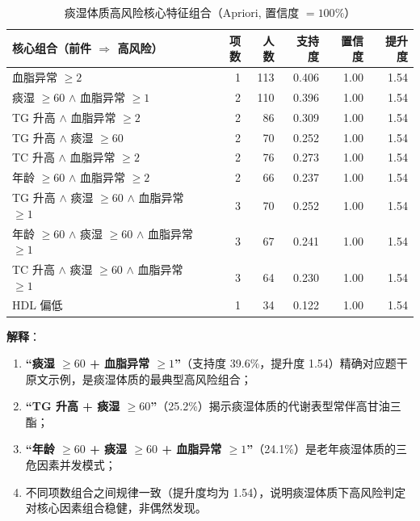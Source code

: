 \documentclass{MathorCupmodeling}
\providecommand{\tightlist}{%
  \setlength{\itemsep}{0pt}\setlength{\parskip}{0pt}}
\begin{document}
\begin{table}[H]
\centering\small
\caption{痰湿体质高风险核心特征组合（Apriori, 置信度 $=100\%$）}\label{tab:q2-apriori}
\begin{tabular}{@{}l r r r r r@{}}
\toprule
核心组合（前件 $\Rightarrow$ 高风险） & 项数 & 人数 & 支持度 & 置信度 & 提升度 \\
\midrule
血脂异常 $\ge 2$                                           & 1 & 113 & 0.406 & 1.00 & 1.54 \\
痰湿 $\ge 60$ $\land$ 血脂异常 $\ge 1$                     & 2 & 110 & 0.396 & 1.00 & 1.54 \\
TG 升高 $\land$ 血脂异常 $\ge 2$                           & 2 &  86 & 0.309 & 1.00 & 1.54 \\
TG 升高 $\land$ 痰湿 $\ge 60$                              & 2 &  70 & 0.252 & 1.00 & 1.54 \\
TC 升高 $\land$ 血脂异常 $\ge 2$                           & 2 &  76 & 0.273 & 1.00 & 1.54 \\
年龄 $\ge 60$ $\land$ 血脂异常 $\ge 2$                     & 2 &  66 & 0.237 & 1.00 & 1.54 \\
TG 升高 $\land$ 痰湿 $\ge 60$ $\land$ 血脂异常 $\ge 1$     & 3 &  70 & 0.252 & 1.00 & 1.54 \\
年龄 $\ge 60$ $\land$ 痰湿 $\ge 60$ $\land$ 血脂异常 $\ge 1$ & 3 &  67 & 0.241 & 1.00 & 1.54 \\
TC 升高 $\land$ 痰湿 $\ge 60$ $\land$ 血脂异常 $\ge 1$     & 3 &  64 & 0.230 & 1.00 & 1.54 \\
HDL 偏低                                                   & 1 &  34 & 0.122 & 1.00 & 1.54 \\
\bottomrule
\end{tabular}
\end{table}

\textbf{解释}：

\begin{enumerate}
\def\labelenumi{(\arabic{enumi})}
\tightlist
\item \textbf{``痰湿 $\ge 60$ + 血脂异常 $\ge 1$''}（支持度 39.6\%，提升度 1.54）精确对应题干原文示例，是痰湿体质的最典型高风险组合；
\item \textbf{``TG 升高 + 痰湿 $\ge 60$''}（25.2\%）揭示痰湿体质的代谢表型常伴高甘油三酯；
\item \textbf{``年龄 $\ge 60$ + 痰湿 $\ge 60$ + 血脂异常 $\ge 1$''}（24.1\%）是老年痰湿体质的三危因素并发模式；
\item 不同项数组合之间规律一致（提升度均为 1.54），说明痰湿体质下高风险判定对核心因素组合稳健，非偶然发现。
\end{enumerate}
\end{document}
